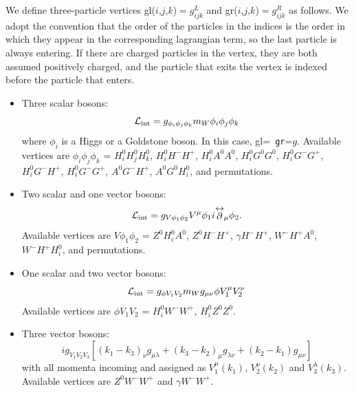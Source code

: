 \documentclass[a4paper,10pt,oneside]{book}
\newcommand{\lrpartial}{
 {\stackrel{\hbox{\small $\leftrightarrow$}}{\partial}}}
\newcommand{\ft}[1]{\textsf{#1}}
\begin{document}
We define three-particle vertices \ft{gl($i$,$j$,$k$)}$=g^L_{ijk}$ and
\ft{gr($i$,$j$,$k$)}$=g^R_{ijk}$ as follows. We adopt the convention
that the order of the particles in the indices is the order in which
they appear in the corresponding lagrangian term, so the last particle
is always entering. If there are charged particles in the vertex, they
are both assumed positively charged, and the particle that exits the
vertex is indexed before the particle that enters.
\begin{itemize}
\item Three scalar bosons:
\begin{equation}
{\cal L}_{\rm int} = g_{\phi_i\phi_j\phi_k} m_W \phi_i \phi_j \phi_k
\end{equation}
where $\phi_i$ is a Higgs or a Goldstone boson. In this case, \ft{gl}={\tt
  gr}=$g$. Available vertices are $\phi_i\phi_j\phi_k$ = $H^0_iH^0_jH^0_k$,
$H^0_iH^-H^+$, $H^0_iA^0A^0$, $H^0_iG^0G^0$, $H^0_iG^-G^+$, $H^0_iG^-H^+$,
$H^0_iG^-G^+$, $A^0G^-H^+$, $A^0G^0H^0_i$, and permutations.

\item Two scalar and one vector bosons:
\begin{equation}
{\cal L}_{\rm int} = g_{V\phi_1\phi_2} V^\mu \phi_1 i \lrpartial_\mu \phi_2 .
\end{equation}
Available vertices are $V\phi_1\phi_2$ = $Z^0H^0_iA^0$, $Z^0H^-H^+$, $\gamma
H^-H^+$, $W^-H^+A^0$, $W^-H^+H^0_i$, and permutations.

\item One scalar and two vector bosons:
\begin{equation}
{\cal L}_{\rm int} = g_{\phi V_1 V_2} m_W g_{\mu\nu} \phi V^\mu_1 V^\nu_2
\end{equation}
Available vertices are $\phi V_1V_2$ = $H^0_iW^-W^+$, $H^0_iZ^0Z^0$.

\item Three vector bosons:
\begin{equation}
i g_{V_1V_2V_3} \left[ (k_1-k_3)_\nu g_{\mu\lambda} + (k_3-k_2)_\mu
  g_{\lambda\nu} + (k_2-k_1) g_{\mu\nu} \right]
\end{equation}
with all momenta incoming and assigned as $V_1^\mu(k_1)$, $V_2^\nu(k_2)$ and
$V_3^\lambda(k_3)$. 
Available vertices are $Z^0W^-W^+$ and $\gamma W^-W^+$.


\end{itemize}
\end{document}
